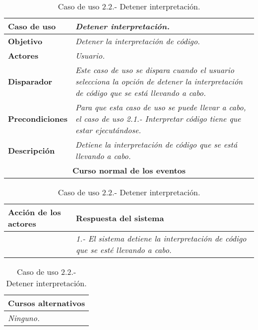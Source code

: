    \begin{table}[!ht] %
      \centering
      \begin{tabular}{|p{4cm}|p{11.5cm}|}
      \hline
      \textbf{Caso de uso} & \textit{Detener interpretación.}\\ \hline  
      \textbf{Objetivo} & \textit{Detener la interpretación de código.}\\\hline
      \textbf{Actores} & \textit{Usuario.}\\ \hline
      \textbf{Disparador} & \textit{Este caso de uso se dispara cuando el usuario selecciona la opción de detener la interpretación de código
            que se está llevando a cabo.}\\ \hline
      \textbf{Precondiciones} & \textit{Para que esta caso de uso se puede llevar a cabo, el caso de uso 2.1.- Interpretar código tiene que estar
              ejecutándose.}\\ \hline
      \textbf{Descripción} & \textit{Detiene la interpretación de código que se está llevando a cabo.}\\ \hline
      \multicolumn{2}{|c|}{\textbf{Curso normal de los eventos}}\\ \hline
    \end{tabular}
    \begin{tabular}{|p{7.75cm}|p{7.75cm}|}
      \hspace{2cm}\textbf{Acción de los actores} & \hspace{1.75cm}\textbf{Respuesta del sistema}\\ \hline
            & \textit{1.- El sistema detiene la interpretación de código que se esté llevando a cabo.} \\ \hline
    \end{tabular}
    \begin{tabular}{|p{15.9cm}|}
      \hspace{6cm}\textbf{Cursos alternativos}\\ \hline     
      \textit{Ninguno.} \\ \hline
    \end{tabular}
    \caption{Caso de uso 2.2.- Detener interpretación.}
   \end{table}


